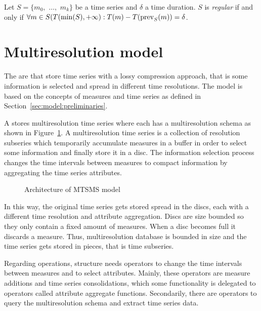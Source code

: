 \begin{definition}
  Let $S=\{m_0,$ $\ldots,$ $m_k\}$ be a time series and $\delta$ a time
  duration. $S$ is \emph{regular} if and only if $\forall m \in
  S(T(\min(S),+\infty):T(m) - T(\operatorname*{prev}_S(m)) = \delta$.
\end{definition}





\section{Multiresolution model}
\label{sec:MTSMS}


The  are  that store time series with a lossy
compression approach, that is some information is selected and spread in
different time resolutions. The  model is based on the
concepts of measures and time series as defined in
Section~\ref{sec:model:preliminaries}.


A  stores multiresolution time series where each has a
multiresolution schema as shown in Figure~\ref{fig:model:mtsdb}. A
multiresolution time series is a collection of resolution subseries
which temporarily accumulate measures in a buffer in order to select
some information and finally store it in a disc. The information
selection process changes the time intervals between measures to
compact information by aggregating the time series attributes. 

\begin{figure}
  \centering
  
  \caption{Architecture of MTSMS model}
  \label{fig:model:mtsdb}
\end{figure}


In this way, the original time series gets stored spread in the discs,
each with a different time resolution and attribute aggregation.
Discs are size bounded so they only contain a fixed amount of
measures. When a disc becomes full it discards a measure. Thus,
multiresolution database is bounded in size and the time series gets
stored in pieces, that is time subseries.

Regarding operations,  structure needs operators to change
the time intervals between measures and to select attributes. Mainly,
these operators are measure additions and time series consolidations,
which some functionality is delegated to operators called attribute
aggregate functions. Secondarily, there are operators to query the
multiresolution schema and extract time series data.



